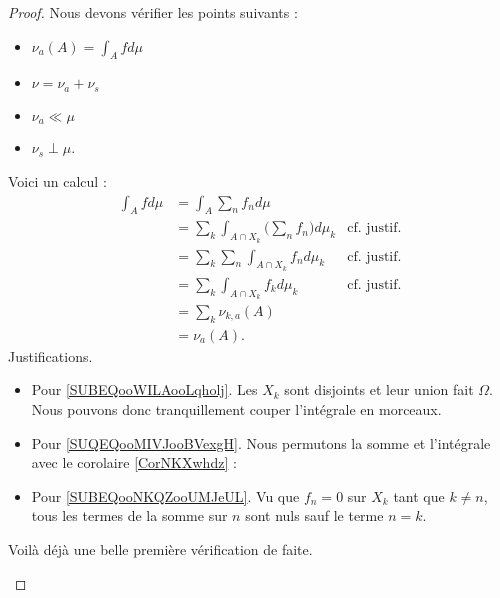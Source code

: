 \begin{proof}
	Nous devons vérifier les points suivants :
	\begin{itemize}
		\item
		      \( \nu_a(A)=\int_Afd\mu\)
		\item
		      $\nu=\nu_a+\nu_s$
		\item
		      \( \nu_a\ll \mu\)
		\item
		      \( \nu_s\perp\mu\).
	\end{itemize}
	\begin{subproof}
		\spitem[\( \int_Adf\mu=\nu(A)\)]
		Voici un calcul :
		\begin{subequations}
			\begin{align}
				\int_Afd\mu & =\int_A\sum_nf_nd\mu                                                                                 \\
				            & =\sum_k\int_{A\cap X_k}\big( \sum_nf_n \big)d\mu_k & \text{cf. justif.}	\label{SUBEQooWILAooLqholj}  \\
				            & = \sum_k\sum_n\int_{A\cap X_k}f_nd\mu_k            & \text{cf. justif.}\label{SUQEQooMIVJooBVexgH}   \\
				            & = \sum_k\int_{A\cap X_k}f_kd\mu_k                  & \text{cf. justif.}		\label{SUBEQooNKQZooUMJeUL} \\
				            & = \sum_k \nu_{k,a}(A)                                                                                \\
				            & =\nu_a(A).
			\end{align}
		\end{subequations}
		Justifications.
		\begin{itemize}
			\item
			      Pour \eqref{SUBEQooWILAooLqholj}. Les \( X_k\) sont disjoints et leur union fait \( \Omega\). Nous pouvons donc tranquillement couper l'intégrale en morceaux.
			\item
			      Pour \eqref{SUQEQooMIVJooBVexgH}.
			      Nous permutons la somme et l'intégrale avec le corolaire \ref{CorNKXwhdz} :
			\item
			      Pour \eqref{SUBEQooNKQZooUMJeUL}. Vu que \( f_n=0\) sur \( X_k\) tant que \( k\neq n\), tous les termes de la somme sur \( n\) sont nuls sauf le terme \( n=k\).
		\end{itemize}
		Voilà déjà une belle première vérification de faite.


\end{subproof}
\end{proof}
